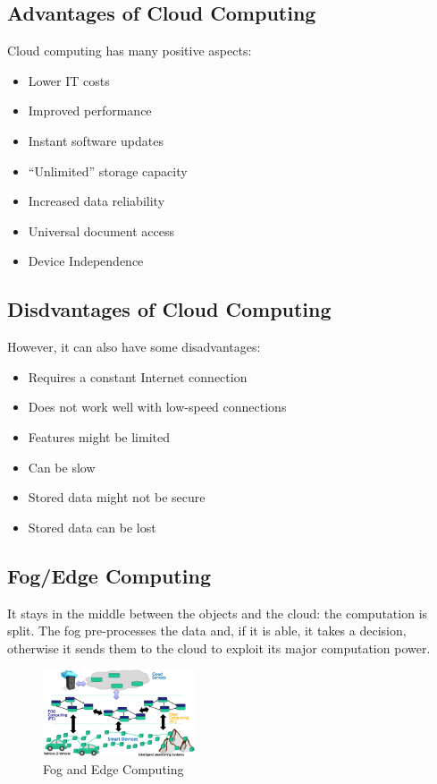 \documentclass[10pt, oneside]{article}
\begin{document}
\begin{multicols}{2}
    \subsection{Advantages of Cloud Computing}
Cloud computing has many positive aspects:\begin{itemize}
    \item Lower IT costs
    \item Improved performance
    \item Instant software updates
    \item “Unlimited” storage capacity
    \item Increased data reliability
    \item Universal document access
    \item Device Independence
\end{itemize}
\columnbreak
\subsection{Disdvantages of Cloud Computing}
However, it can also have some disadvantages:\begin{itemize}
    \item Requires a constant Internet connection
    \item Does not work well with low-speed connections
    \item Features might be limited
    \item Can be slow
    \item Stored data might not be secure
    \item Stored data can be lost
\end{itemize}
\end{multicols}


\subsection{Fog/Edge Computing}
\begin{multicols}{2}
    It stays in the middle between the objects and the cloud: the computation is split. The fog pre-processes the data and, if it is able, it takes a decision, otherwise it sends them to the cloud to exploit its major computation power.
    \columnbreak
    \begin{figure}[H]
        \begin{center}
        \includegraphics[width=0.4\textwidth]{img/img52.png}
        \caption{Fog and Edge Computing}
        \label{fig:Fog/Edge Comp}
        \end{center}
    \end{figure}
\end{multicols}
\end{document}
